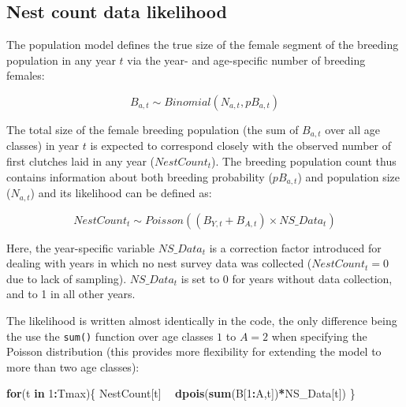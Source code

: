 \documentclass[
]{book}
\newenvironment{Shaded}{\begin{snugshade}}{\end{snugshade}}
\newcommand{\ControlFlowTok}[1]{\textcolor[rgb]{0.13,0.29,0.53}{\textbf{#1}}}
\newcommand{\DecValTok}[1]{\textcolor[rgb]{0.00,0.00,0.81}{#1}}
\newcommand{\KeywordTok}[1]{\textcolor[rgb]{0.13,0.29,0.53}{\textbf{#1}}}
\newcommand{\NormalTok}[1]{#1}
\newcommand{\OperatorTok}[1]{\textcolor[rgb]{0.81,0.36,0.00}{\textbf{#1}}}
\newcommand{\StringTok}[1]{\textcolor[rgb]{0.31,0.60,0.02}{#1}}
\begin{document}
\hypertarget{nest-count-data-likelihood}{%
\subsection{Nest count data likelihood}\label{nest-count-data-likelihood}}

The population model defines the true size of the female segment of the breeding
population in any year \(t\) via the year- and age-specific number of breeding
females:

\begin{equation}
B_{a,t}  \sim Binomial(N_{a,t}, pB_{a,t})
\end{equation}

The total size of the female breeding population (the sum of \(B_{a,t}\) over all
age classes) in year \(t\) is expected to correspond closely with the observed
number of first clutches laid in any year (\(NestCount_t\)).
The breeding population count thus contains information about both breeding
probability (\(pB_{a,t}\)) and population size (\(N_{a,t}\)) and its likelihood can
be defined as:

\begin{equation}
NestCount_t  \sim Poisson((B_{Y,t} + B_{A,t}) \times NS\_Data_t)
\end{equation}

Here, the year-specific variable \(NS\_Data_t\) is a correction factor introduced
for dealing with years in which no nest survey data was collected
(\(NestCount_t = 0\) due to lack of sampling). \(NS\_Data_t\) is set to 0 for years
without data collection, and to 1 in all other years.

The likelihood is written almost identically in the code, the only difference
being the use the \texttt{sum()} function over age classes \(1\) to \(A=2\) when
specifying the Poisson distribution (this provides more flexibility for
extending the model to more than two age classes):

\begin{Shaded}
\begin{Highlighting}[]
\ControlFlowTok{for}\NormalTok{(t }\ControlFlowTok{in} \DecValTok{1}\OperatorTok{:}\NormalTok{Tmax)\{}
\NormalTok{  NestCount[t] }\OperatorTok{~}\StringTok{ }\KeywordTok{dpois}\NormalTok{(}\KeywordTok{sum}\NormalTok{(B[}\DecValTok{1}\OperatorTok{:}\NormalTok{A,t])}\OperatorTok{*}\NormalTok{NS_Data[t])}
\NormalTok{\}}
\end{Highlighting}
\end{Shaded}
\end{document}
